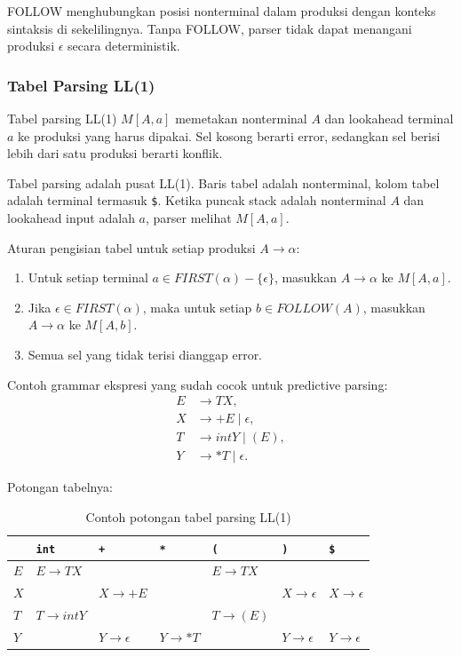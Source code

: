 FOLLOW menghubungkan posisi nonterminal dalam produksi dengan konteks sintaksis di sekelilingnya. Tanpa FOLLOW, parser tidak dapat menangani produksi $\epsilon$ secara deterministik.

\subsubsection{Tabel Parsing LL(1)}

\begin{jawab}
Tabel parsing LL(1) $M[A,a]$ memetakan nonterminal $A$ dan lookahead terminal $a$ ke produksi yang harus dipakai. Sel kosong berarti error, sedangkan sel berisi lebih dari satu produksi berarti konflik.
\end{jawab}

Tabel parsing adalah pusat LL(1). Baris tabel adalah nonterminal, kolom tabel adalah terminal termasuk \texttt{\$}. Ketika puncak stack adalah nonterminal $A$ dan lookahead input adalah $a$, parser melihat $M[A,a]$.

Aturan pengisian tabel untuk setiap produksi $A\rightarrow\alpha$:
\begin{enumerate}
    \item Untuk setiap terminal $a\in FIRST(\alpha)-\{\epsilon\}$, masukkan $A\rightarrow\alpha$ ke $M[A,a]$.
    \item Jika $\epsilon\in FIRST(\alpha)$, maka untuk setiap $b\in FOLLOW(A)$, masukkan $A\rightarrow\alpha$ ke $M[A,b]$.
    \item Semua sel yang tidak terisi dianggap error.
\end{enumerate}

Contoh grammar ekspresi yang sudah cocok untuk predictive parsing:
\[
\begin{aligned}
E &\rightarrow TX,\\
X &\rightarrow +E \mid \epsilon,\\
T &\rightarrow intY \mid (E),\\
Y &\rightarrow *T \mid \epsilon.
\end{aligned}
\]

Potongan tabelnya:

\begin{table}[H]
\centering
\scriptsize
\begin{tabularx}{\textwidth}{|L{0.12\textwidth}|*{6}{>{\centering\arraybackslash}X|}}
\hline
\textbf{} & \textbf{\texttt{int}} & \textbf{\texttt{+}} & \textbf{\texttt{*}} & \textbf{\texttt{(}} & \textbf{\texttt{)}} & \textbf{\texttt{\$}} \\
\hline
$E$ & $E\rightarrow TX$ & & & $E\rightarrow TX$ & & \\
\hline
$X$ & & $X\rightarrow +E$ & & & $X\rightarrow\epsilon$ & $X\rightarrow\epsilon$ \\
\hline
$T$ & $T\rightarrow intY$ & & & $T\rightarrow (E)$ & & \\
\hline
$Y$ & & $Y\rightarrow\epsilon$ & $Y\rightarrow *T$ & & $Y\rightarrow\epsilon$ & $Y\rightarrow\epsilon$ \\
\hline
\end{tabularx}
\caption{Contoh potongan tabel parsing LL(1)}
\label{tab:contoh-tabel-ll1}
\end{table}

